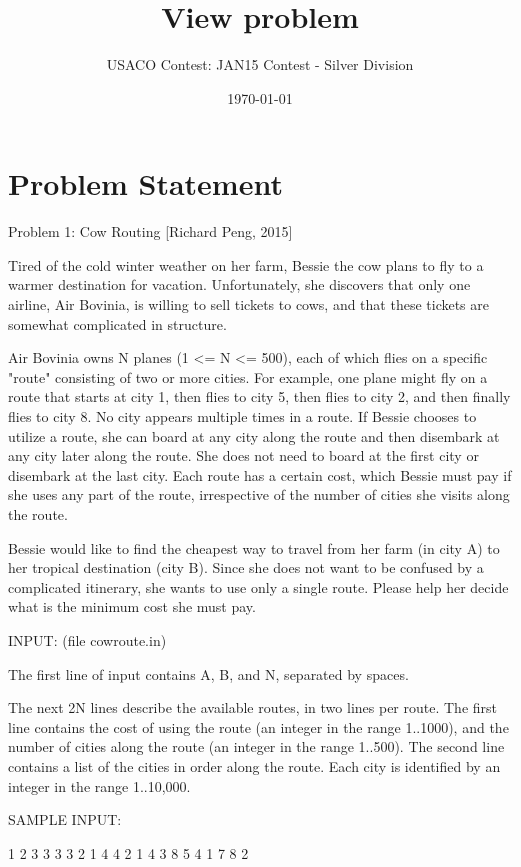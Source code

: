 \documentclass[12pt]{article}
\title{View problem}
\author{USACO Contest: JAN15 Contest - Silver Division}
\date{\today}
\begin{document}
\maketitle

\section*{Problem Statement}

Problem 1: Cow Routing [Richard Peng, 2015]

Tired of the cold winter weather on her farm, Bessie the cow plans to
fly to a warmer destination for vacation.  Unfortunately, she
discovers that only one airline, Air Bovinia, is willing to sell
tickets to cows, and that these tickets are somewhat complicated in
structure.

Air Bovinia owns N planes (1 <= N <= 500), each of which flies on a
specific "route" consisting of two or more cities.  For example, one
plane might fly on a route that starts at city 1, then flies to city
5, then flies to city 2, and then finally flies to city 8.  No city
appears multiple times in a route.  If Bessie chooses to utilize a
route, she can board at any city along the route and then disembark at
any city later along the route.  She does not need to board at the
first city or disembark at the last city.  Each route has a certain
cost, which Bessie must pay if she uses any part of the route,
irrespective of the number of cities she visits along the route.

Bessie would like to find the cheapest way to travel from her farm
(in city A) to her tropical destination (city B). Since she does not
want to be confused by a complicated itinerary, she wants to use only
a single route.  Please help her decide what is the minimum cost she
must pay.

INPUT: (file cowroute.in)

The first line of input contains A, B, and N, separated by spaces.  

The next 2N lines describe the available routes, in two lines per
route. The first line contains the cost of using the route (an integer
in the range 1..1000), and the number of cities along the route (an
integer in the range 1..500).  The second line contains a list of the
cities in order along the route.  Each city is identified by an
integer in the range 1..10,000.

SAMPLE INPUT:

1 2 3
3 3
3 2 1
4 4
2 1 4 3
8 5
4 1 7 8 2
\end{document}
